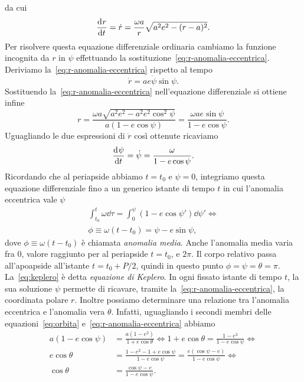 da cui
\begin{equation}
  \frac{{\mathop{}\!\mathrm{d}^{}}r}{\mathop{}\!\mathrm{d} {t}^{}} = \dot{r} = \frac{\omega a}{r}\sqrt{a^2e^2 - (r-a)^2}.
\end{equation}
Per risolvere questa equazione differenziale ordinaria cambiamo la funzione
incognita da $r$ in $\psi$ effettuando la
sostituzione~\eqref{eq:r-anomalia-eccentrica}. Deriviamo
la~\eqref{eq:r-anomalia-eccentrica} rispetto al tempo
\begin{equation}
  \dot{r} = ae\dot{\psi}\sin\psi.
\end{equation}
Sostituendo la~\eqref{eq:r-anomalia-eccentrica} nell'equazione differenziale si
ottiene infine
\begin{equation}
  r = \frac{\omega a\sqrt{a^2e^2 - a^2e^2\cos^2\psi}}{a(1-e\cos\psi)} =
  \frac{\omega ae\sin\psi}{1-e\cos\psi}.
\end{equation}
Uguagliando le due espressioni di $\dot{r}$ così ottenute ricaviamo
\begin{equation}
  \frac{{\mathop{}\!\mathrm{d}^{}}\psi}{\mathop{}\!\mathrm{d} {t}^{}} = \dot{\psi} = \frac{\omega}{1-e\cos\psi}.
\end{equation}
Ricordando che al periapside abbiamo $t = t_0$ e $\psi = 0$, integriamo questa
equazione differenziale fino a un generico istante di tempo $t$ in cui
l'anomalia eccentrica vale $\psi$
\begin{gather}
  \int_{t_0}^t \omega\dd \tau = \int_0^\psi(1-e\cos\psi')\dd \psi' \iff\\
  \phi \equiv \omega(t - t_0) = \psi - e\sin\psi, \label{eq:keplero}
\end{gather}
dove $\phi \equiv \omega(t-t_0)$ è chiamata \emph{anomalia media}. Anche
l'anomalia media varia fra $0$, valore raggiunto per al periapside $t = t_0$, e
$2\pi$. Il corpo relativo passa all'apoapside all'istante $t = t_0 + P/2$,
quindi in questo punto $\phi = \psi = \theta = \pi$. La~\eqref{eq:keplero} è
detta \emph{equazione di Keplero}. In ogni fissato istante di tempo $t$, la sua
soluzione $\psi$ permette di ricavare, tramite
la~\eqref{eq:r-anomalia-eccentrica}, la coordinata polare $r$. Inoltre possiamo
determinare una relazione tra l'anomalia eccentrica e l'anomalia vera $\theta$.
Infatti, uguagliando i secondi membri delle equazioni~\eqref{eq:orbita}
e~\eqref{eq:r-anomalia-eccentrica} abbiamo
\begin{equation}
  \begin{aligned}
    a(1-e\cos\psi) &= \frac{a(1-e^2)}{1+e\cos\theta} \iff 1+e\cos\theta =
    \frac{1-e^2}{1-e\cos\psi} \iff \\
    e\cos\theta &= \frac{1-e^2-1+e\cos\psi}{1-e\cos\psi} =
    \frac{e(\cos\psi-e)}{1-e\cos\psi} \iff \\
    \cos\theta &= \frac{\cos\psi-e}{1-e\cos\psi}.
  \end{aligned}
\end{equation}
